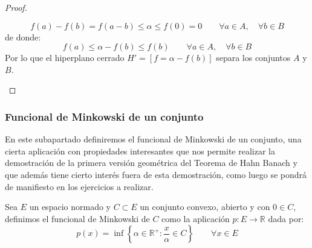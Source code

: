 \begin{teo}
\begin{proof}
\begin{description}
                \begin{equation*}
                    f(a) - f(b) = f(a-b) \leq \alpha \leq f(0) = 0 \qquad \forall a\in A, \quad \forall b\in B
                \end{equation*}
                de donde:
                \begin{equation*}
                    f(a) \leq \alpha - f(b) \leq f(b) \qquad \forall a\in A, \quad \forall b\in B
                \end{equation*}
                Por lo que el hiperplano cerrado $H' = [f=\alpha-f(b)]$ separa los conjuntos $A$ y $B$.
        \end{description}
    \end{proof}
\end{teo}

\subsubsection{Funcional de Minkowski de un conjunto}
\noindent
En este subapartado definiremos el funcional de Minkowski de un conjunto, una cierta aplicación con propiedades interesantes que nos permite realizar la demostración de la primera versión geométrica del Teorema de Hahn Banach y que además tiene cierto interés fuera de esta demostración, como luego se pondrá de manifiesto en los ejercicios a realizar.

\begin{definicion}\label{def:f_minkowski}
    Sea $E$ un espacio normado y $C\subset E$ un conjunto convexo, abierto y con $0\in C$, definimos el funcional de Minkowski de $C$ como la aplicación $p:E\to \mathbb{R}$ dada por:
    \begin{equation*}
        p(x) = \inf \left\{\alpha\in \mathbb{R}^+ : \dfrac{x}{\alpha}\in C\right\} \qquad \forall x\in E
    \end{equation*}
\end{definicion}

